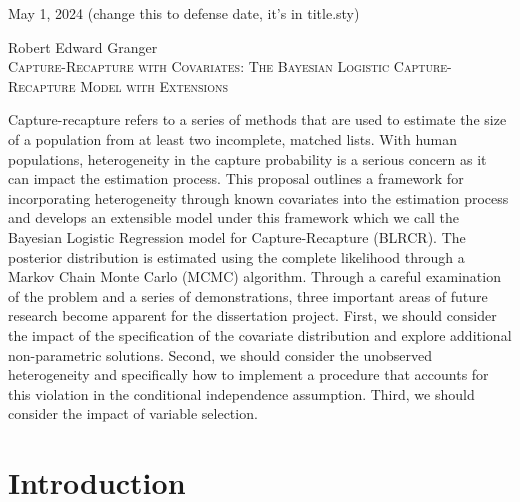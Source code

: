 \documentclass[
  12pt,
]{article}
\begin{document}
\vspace*{20\baselineskip}

\raggedright

May 1, 2024 (change this to defense date, it's in title.sty)

\newpage
\doublespacing
\begin{center}
Robert Edward Granger\\
\textsc{Capture-Recapture with Covariates: The Bayesian Logistic Capture-Recapture Model with Extensions}\\
\end{center}

\normalsize

Capture-recapture refers to a series of methods that are used to estimate the size of a population from at least two incomplete, matched lists.  With human populations, heterogeneity in the capture probability is a serious concern as it can impact the estimation process. This proposal outlines a framework for incorporating heterogeneity through known covariates into the estimation process and develops an extensible model under this framework which we call the Bayesian Logistic Regression model for Capture-Recapture (BLRCR). The posterior distribution is estimated using the complete likelihood through a Markov Chain Monte Carlo (MCMC) algorithm.  Through a careful examination of the problem and a series of demonstrations, three important areas of future research become apparent for the dissertation project. First, we should consider the impact of the specification of the covariate distribution and explore additional non-parametric solutions.  Second, we should consider the unobserved heterogeneity and specifically how to implement a procedure that accounts for this violation in the conditional independence assumption.  Third, we should consider the impact of variable selection.

\newpage
\tableofcontents
\newpage

\hypersetup{linkcolor = blue}


\section{Introduction}
\label{sec:Introduction}
\end{document}
